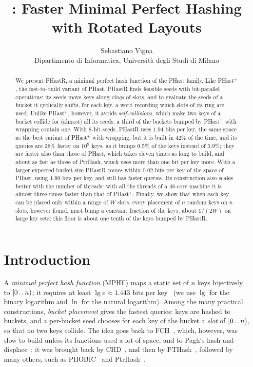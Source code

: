 \documentclass[11pt]{article}
\title{\PHastR: Faster Minimal Perfect Hashing\\with Rotated Layouts}
\author{Sebastiano Vigna\\Dipartimento di Informatica, Università degli Studi di Milano}
\date{}
\def\..{\,\mathpunct{\ldotp\ldotp}} %
\newcommand{\PHast}{PHast\xspace}
\newcommand{\PHastP}{PHast$^+$\xspace}
\newcommand{\PHastR}{PHastR\xspace}
\begin{document}

\maketitle

\begin{abstract}
We present \PHastR, a minimal perfect hash function of the \PHast family. Like
\PHastP, the fast-to-build variant of \PHast, \PHastR finds feasible seeds with
bit-parallel operations: its seeds move keys along \emph{rings} of slots, and
to evaluate the seeds of a bucket it cyclically shifts, for each key, a word
recording which slots of its ring are used. Unlike \PHastP, however, it avoids
\emph{self-collisions}, which make two keys of a bucket collide for (almost)
all its seeds: a third of the buckets bumped by \PHastP with wrapping
contain one. With 8-bit seeds, \PHastR uses $1.94$ bits per key, the same
space as the best variant of \PHastP with wrapping, but it is built in
$42\%$ of the time, and its queries are $28\%$ faster on $10^9$ keys, as it
bumps $0.5\%$ of the keys instead of $3.9\%$; they are faster also than those
of \PHast, which takes eleven times as long to build, and about as fast as
those of PtrHash, which uses more than one bit per key more. With a larger
expected bucket size
\PHastR comes within $0.02$ bits per key of the space of \PHast, using
$1.90$ bits per key, and still has faster queries. Its construction also scales
better with the number of threads: with all the threads of a 48-core machine
it is almost three times faster than that of \PHastP. Finally, we show that
when each key can be placed only within a range of $W$ slots, every
placement of $n$ random keys on $n$ slots, however found, must bump a
constant fraction of the keys, about $1/(2W)$ on large key sets: this floor
is about one tenth of the keys bumped by \PHastR.
\end{abstract}

\section{Introduction}

A \emph{minimal perfect hash function} (MPHF) maps a static set of $n$ keys
bijectively to $[0\..n)$; it requires at least $\lg e\approx 1.443$
bits per key~\cite{FKSSSFPHF} (we use $\lg$ for the binary logarithm and $\ln$ for the natural
logarithm). Among the many practical constructions, \emph{bucket placement}
gives the fastest queries: keys are hashed to buckets, and a per-bucket seed
chooses for each key of the bucket a \emph{slot} of $[0\..n)$, so that no two
keys collide.
The idea goes back to FCH~\cite{FCHFACMPHF}, which, however, was slow to
build unless its functions used a lot of space, and to Pagh's
hash-and-displace~\cite{PagHDEEMPHF}; it was brought back by
CHD~\cite{BBDHDC}, and then by PTHash~\cite{PTPRFMPH}, followed by many
others, such as PHOBIC~\cite{HLPPPHOBSIC} and PtrHash~\cite{RagPTR}.
\end{document}
